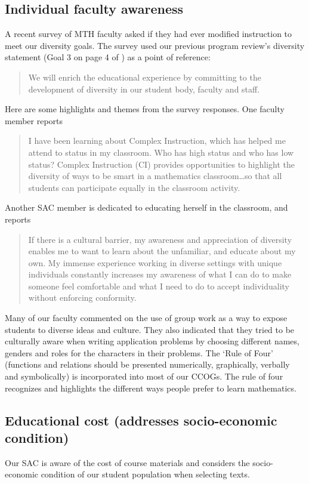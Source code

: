 \subsection{Individual faculty awareness}
A recent survey of MTH faculty asked if they had ever modified instruction to
meet our diversity goals. The survey used our previous program review's
diversity statement (Goal 3 on page 4 of \cite{mathprogramreview2003}) as a point of reference:
\begin{quote}
	We will enrich the educational experience by committing to the development
	of diversity in our student body, faculty and staff.
\end{quote}
Here are some highlights and themes from the survey responses. One faculty
member reports
\begin{quote}
	I have been learning about Complex Instruction, which has helped me attend
	to status in my classroom. Who has high status and who has low status?
	Complex Instruction (CI) provides opportunities to highlight the diversity
	of ways to be smart in a mathematics classroom\ldots so that all students
	can participate equally in the classroom activity.
\end{quote}
Another SAC member is dedicated to educating herself in the classroom, and
reports
\begin{quote}
	If there is a cultural barrier, my awareness and appreciation of diversity
	enables me to want to learn about the unfamiliar, and educate about my own.
	My immense experience working in diverse settings with unique individuals
	constantly increases my awareness of what I can do to make someone feel
	comfortable and what I need to do to accept individuality without enforcing
	conformity.
\end{quote}
Many of our faculty commented on the use of group work as a way to expose
students to diverse ideas and culture.  They also indicated that they tried to
be culturally aware when writing application problems by choosing different
names, genders and roles for the characters in their problems. The `Rule of
Four' (functions and relations should be presented numerically, graphically,
verbally and symbolically) is incorporated into most of our CCOGs. The rule of
four recognizes and highlights the different ways people prefer to learn
mathematics.
\subsection[Educational cost]{Educational cost (addresses socio-economic condition)}
Our SAC is aware of the cost of course materials and considers the
socio-economic condition of our student population when selecting texts.

